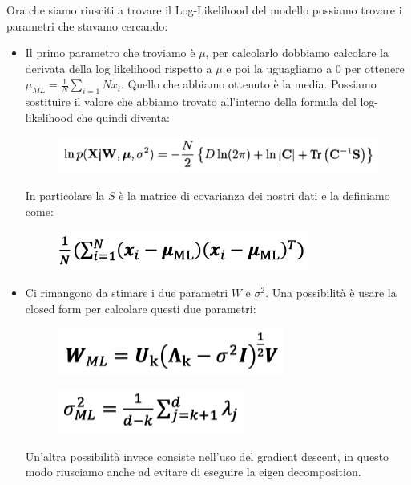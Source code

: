 \documentclass[14pt]{extreport}
\begin{document}
Ora che siamo riusciti a trovare il Log-Likelihood del modello possiamo trovare i parametri che stavamo cercando:
\begin{itemize}
	\item Il primo parametro che troviamo è $\mu$, per calcolarlo dobbiamo calcolare la derivata della log likelihood rispetto a $\mu$ e poi la
	      uguagliamo a 0 per ottenere $\mu_{ML} = \frac{1}{N}\sum_{i=1}{N}x_i$. Quello che abbiamo ottenuto è la media. Possiamo sostituire il valore
	      che abbiamo trovato all'interno della formula del log-likelihood che quindi diventa:
	      \begin{figure}[H]
		      \centering
		      \includegraphics[width=0.7\linewidth]{487.jpeg}
	      \end{figure}
	      In particolare la $S$ è la matrice di covarianza dei nostri dati e la definiamo come:
	      \begin{figure}[H]
		      \centering
		      \includegraphics[width=0.7\linewidth]{488.jpeg}
	      \end{figure}
	\item Ci rimangono da stimare i due parametri $W$ e $\sigma^2$. Una possibilità è usare la closed form per calcolare questi due parametri:
	      \begin{figure}[H]
		      \centering
		      \includegraphics[width=0.7\linewidth]{493.jpeg}
	      \end{figure}
	      \begin{figure}[H]
		      \centering
		      \includegraphics[width=0.7\linewidth]{492.jpeg}
	      \end{figure}
	      Un'altra possibilità invece consiste nell'uso del gradient descent, in questo modo riusciamo anche ad evitare di eseguire la eigen
	      decomposition.
\end{itemize}
\end{document}
